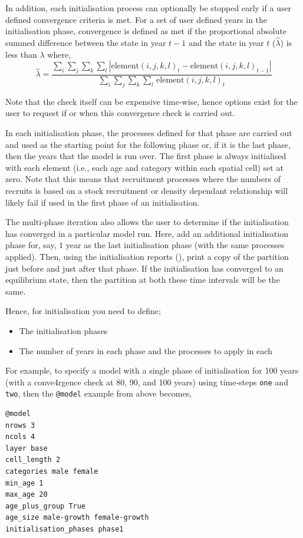 In addition, each initialisation process can optionally be stopped early if a user defined convergence criteria is met. For a set of user defined years in the initialisation phase, convergence is defined as met if the proportional absolute summed difference between the state in year $t-1$ and the state in year $t$ ($\widehat{\lambda}$) is less than $\lambda$ where, 
\begin{equation}
  \widehat{\lambda} = \frac{\sum\limits_{i} \sum\limits_{j} \sum\limits_{k} \sum\limits_l \left|\text{element}(i,j,k,l)_t - \text{element}(i,j,k,l)_{t-1} \right|}{\sum\limits_{i} \sum\limits_{j} \sum\limits_{k} \sum\limits_l \frac{}{}\text{element}(i,j,k,l)_t}
\end{equation}

Note that the check itself can be expensive time-wise, hence options exist for the user to request if or when this convergence check is carried out.

In each initialisation phase, the processes defined for that phase are carried out and used as the starting point for the following phase or, if it is the last phase, then the years that the model is run over. The first phase is always initialised with each element (i.e., each age and category within each spatial cell) set at zero. Note that this means that recruitment processes where the numbers of recruits is based on a stock recruitment or density dependant relationship will likely fail if used in the first phase of an initialisation. 

The multi-phase iteration also allows the user to determine if the initialisation has converged in a particular model run. Here, add an additional initialisation phase for, say, $1$ year as the last initialisation phase (with the same processes applied). Then, using the initialisation reports (), print a copy of the partition just before and just after that phase. If the initialisation has converged to an equilibrium state, then the partition at both these time intervals will be the same.

Hence, for initialisation you need to define;
\begin{itemize}
  \item The initialisation phases
  \item The number of years in each phase and the processes to apply in each
\end{itemize}

For example, to specify a model with a single phase of initialisation for 100 years (with a conve4rgence check at 80, 90, and 100 years) using time-steps \texttt{one} and \texttt{two}, then the \texttt{@model} example from above becomes,
{\small{\begin{verbatim}
@model
nrows 3
ncols 4
layer base
cell_length 2
categories male female
min_age 1
max_age 20
age_plus_group True
age_size male-growth female-growth
initialisation_phases phase1
\end{verbatim}}}

